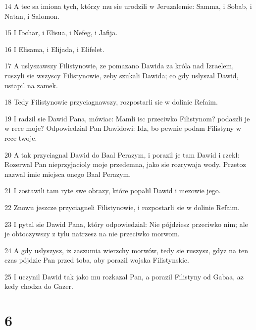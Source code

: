 \par 14 A tec sa imiona tych, którzy mu sie urodzili w Jeruzalemie: Samma, i Sobab, i Natan, i Salomon.
\par 15 I Ibchar, i Elisua, i Nefeg, i Jafija.
\par 16 I Elisama, i Elijada, i Elifelet.
\par 17 A uslyszawszy Filistynowie, ze pomazano Dawida za króla nad Izraelem, ruszyli sie wszyscy Filistynowie, zeby szukali Dawida; co gdy uslyszal Dawid, ustapil na zamek.
\par 18 Tedy Filistynowie przyciagnawszy, rozpostarli sie w dolinie Refaim.
\par 19 I radzil sie Dawid Pana, mówiac: Mamli isc przeciwko Filistynom? podaszli je w rece moje? Odpowiedzial Pan Dawidowi: Idz, bo pewnie podam Filistyny w rece twoje.
\par 20 A tak przyciagnal Dawid do Baal Perazym, i porazil je tam Dawid i rzekl: Rozerwal Pan nieprzyjacioly moje przedemna, jako sie rozrywaja wody. Przetoz nazwal imie miejsca onego Baal Perazym.
\par 21 I zostawili tam ryte swe obrazy, które popalil Dawid i mezowie jego.
\par 22 Znowu jeszcze przyciagneli Filistynowie, i rozpostarli sie w dolinie Refaim.
\par 23 I pytal sie Dawid Pana, który odpowiedzial: Nie pójdziesz przeciwko nim; ale je obtoczywszy z tylu natrzesz na nie przeciwko morwom.
\par 24 A gdy uslyszysz, iz zaszumia wierzchy morwów, tedy sie ruszysz, gdyz na ten czas pójdzie Pan przed toba, aby porazil wojska Filistynskie.
\par 25 I uczynil Dawid tak jako mu rozkazal Pan, a porazil Filistyny od Gabaa, az kedy chodza do Gazer.

\chapter{6}

